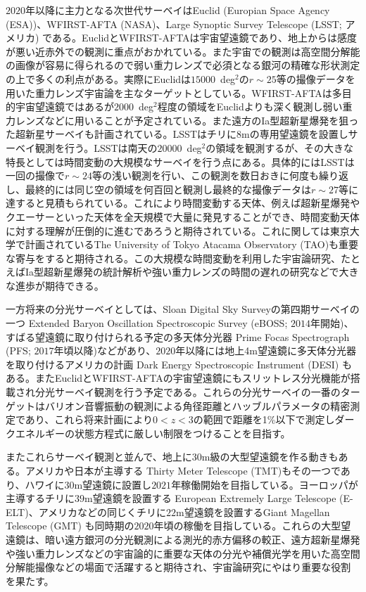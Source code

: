 $2020$年以降に主力となる次世代サーベイはEuclid (Europian Space Agency (ESA))、WFIRST-AFTA (NASA)、Large Synoptic Survey Telescope (LSST; アメリカ) である。EuclidとWFIRST-AFTAは宇宙望遠鏡であり、地上からは感度が悪い近赤外での観測に重点がおかれている。また宇宙での観測は高空間分解能の画像が容易に得られるので弱い重力レンズで必須となる銀河の精確な形状測定の上で多くの利点がある。実際にEuclidは$15000$~deg$^2$の$r\sim25 $等の撮像データを用いた重力レンズ宇宙論を主なターゲットとしている。WFIRST-AFTAは多目的宇宙望遠鏡ではあるが$2000$~deg$^2$程度の領域をEuclidよりも深く観測し弱い重力レンズなどに用いることが予定されている。また遠方のIa型超新星爆発を狙った超新星サーベイも計画されている。LSSTはチリに$8$mの専用望遠鏡を設置しサーベイ観測を行う。LSSTは南天の$20000$~deg$^2$の領域を観測するが、その大きな特長としては時間変動の大規模なサーベイを行う点にある。具体的にはLSSTは一回の撮像で$r\sim 24$等の浅い観測を行い、この観測を数日おきに何度も繰り返し、最終的には同じ空の領域を何百回と観測し最終的な撮像データは$r\sim 27$等に達すると見積もられている。これにより時間変動する天体、例えば超新星爆発やクエーサーといった天体を全天規模で大量に発見することができ、時間変動天体に対する理解が圧倒的に進むであろうと期待されている。これに関しては東京大学で計画されているThe University of Tokyo Atacama Observatory (TAO)も重要な寄与をすると期待される。この大規模な時間変動を利用した宇宙論研究、たとえばIa型超新星爆発の統計解析や強い重力レンズの時間の遅れの研究などで大きな進歩が期待できる。

一方将来の分光サーベイとしては、Sloan Digital Sky Surveyの第四期サーベイの一つ Extended Baryon Oscillation Spectroscopic Survey (eBOSS; $2014$年開始)、すばる望遠鏡に取り付けられる予定の多天体分光器 Prime Focas Spectrograph (PFS; $2017$年頃以降)などがあり、$2020$年以降には地上4m望遠鏡に多天体分光器を取り付けるアメリカの計画 Dark Energy Spectroscopic Instrument (DESI) もある。またEuclidとWFIRST-AFTAの宇宙望遠鏡にもスリットレス分光機能が搭載され分光サーベイ観測を行う予定である。これらの分光サーベイの一番のターゲットはバリオン音響振動の観測による角径距離とハッブルパラメータの精密測定であり、これら将来計画により$0<z<3$の範囲で距離を1\%以下で測定しダークエネルギーの状態方程式に厳しい制限をつけることを目指す。

またこれらサーベイ観測と並んで、地上に$30$m級の大型望遠鏡を作る動きもある。アメリカや日本が主導する Thirty Meter Telescope (TMT)もその一つであり、ハワイに$30$m望遠鏡に設置し$2021$年稼働開始を目指している。ヨーロッパが主導するチリに$39$m望遠鏡を設置する European Extremely Large Telescope (E-ELT)、アメリカなどの同じくチリに$22$m望遠鏡を設置するGiant Magellan Telescope (GMT) も同時期の$2020$年頃の稼働を目指している。これらの大型望遠鏡は、暗い遠方銀河の分光観測による測光的赤方偏移の較正、遠方超新星爆発や強い重力レンズなどの宇宙論的に重要な天体の分光や補償光学を用いた高空間分解能撮像などの場面で活躍すると期待され、宇宙論研究にやはり重要な役割を果たす。



